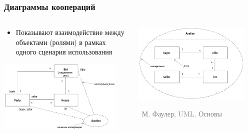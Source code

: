 \documentclass[xetex,mathserif,serif]{beamer}
\newcommand{\attribution}[1] {
	\vspace{-5mm}\begin{flushright}\begin{scriptsize}\textcolor{gray}{\textcopyright\, #1}\end{scriptsize}\end{flushright}
}
\begin{document}
	\begin{frame}
		\frametitle{Диаграммы коопераций}
		\begin{columns}
			\begin{column}{0.5\textwidth}
				\begin{itemize}
					\item Показывают взаимодействие между объектами (ролями) в рамках одного сценария использования
				\end{itemize}
				\vspace{3mm}
				\begin{center}
					\includegraphics[width=0.9\textwidth]{cooperationAlternateNotation.png}
				\end{center}
			\end{column}
			\begin{column}{0.5\textwidth}
				\begin{center}
					\includegraphics[width=0.9\textwidth]{cooperationDiagram.png}
					\attribution{М. Фаулер, UML. Основы}
				\end{center}
			\end{column}
		\end{columns}
	\end{frame}
\end{document}
